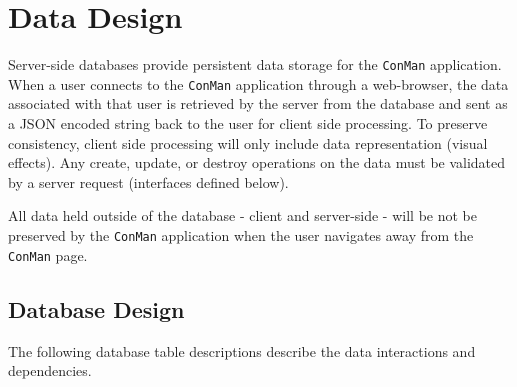 \documentclass{article}
\begin{document}
%
%
%
%


\newpage
\section{Data Design}
Server-side databases provide persistent data storage for the \texttt{ConMan} application.
When a user connects to the \texttt{ConMan} application through a web-browser, the data associated with that user is retrieved by the server from the database and sent as a JSON encoded string back to the user for client side processing.
To preserve consistency, client side processing will only include data representation (visual effects).
Any create, update, or destroy operations on the data must be validated by a server request (interfaces defined below).

All data held outside of the database - client and server-side -  will be not be preserved by the \texttt{ConMan} application when the user navigates away from the \texttt{ConMan} page.

\subsection{Database Design}
The following database table descriptions describe the data interactions and dependencies.
\end{document}
